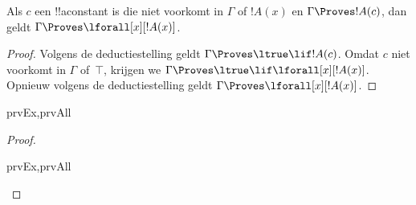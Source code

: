 \documentclass[openany]{memoir}
\begin{document}
\begin{thm}
 Als $c$ een !!a{constant} is die niet
voorkomt in $\Gamma$ of $!A(x)$ en $\Gamma \Proves !A(c)$, dan geldt
$\Gamma \Proves \lforall[x][!A(x)]$.
\end{thm}

\begin{proof}
Volgens de deductiestelling geldt $\Gamma \Proves \ltrue \lif !A(c)$.
Omdat $c$ niet voorkomt in $\Gamma$ of~$\top$, krijgen we
$\Gamma \Proves \ltrue \lif \lforall[x][!A(x)]$. Opnieuw volgens de
deductiestelling geldt $\Gamma \Proves \lforall[x][!A(x)]$.
\end{proof}

\begin{prop}
\begin{tagenumerate}{prvEx,prvAll}

\end{tagenumerate}
\end{prop}

\begin{proof}
\begin{tagenumerate}{prvEx,prvAll}
\end{tagenumerate}
\end{proof}
\endgroup

\begingroup
\def\olfilename{OLP-0124}
\def\olfilepath{content/first-order-logic/axiomatic-deduction/}
\hypertarget{unit-OLP-0124}{}



      {}
      {}
      
\end{document}
